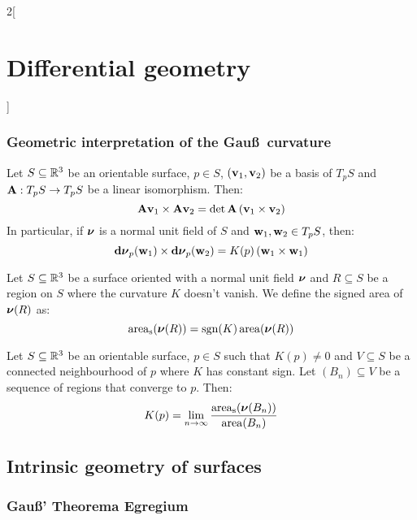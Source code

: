 \documentclass[../../../main.tex]{subfiles}
\begin{document}
\begin{multicols}{2}[\section{Differential geometry}]
  \subsubsection{Geometric interpretation of the Gau\ss\ curvature}
  \begin{lemma}
    Let $S\subseteq\mathbb{R}^3$ be an orientable surface, $p\in S$, $(\boldsymbol{\mathrm{v}}_1,\boldsymbol{\mathrm{v}}_2)$ be a basis of $T_pS$ and $\boldsymbol{\mathrm{A}}:T_pS\rightarrow T_pS$ be a linear isomorphism. Then: $$\boldsymbol{\mathrm{A}}\boldsymbol{\mathrm{v}}_1\times\boldsymbol{\mathrm{A}}\boldsymbol{\mathrm{v}}_2=\det\boldsymbol{\mathrm{A}}\left(\boldsymbol{\mathrm{v}}_1\times\boldsymbol{\mathrm{v}}_2\right)$$
    In particular, if $\boldsymbol{\mathrm{\nu}}$ is a normal unit field of $S$ and $\boldsymbol{\mathrm{w}}_1,\boldsymbol{\mathrm{w}}_2\in T_pS$, then: $$\boldsymbol{\mathrm{\dd{\nu}}}_p(\boldsymbol{\mathrm{w}}_1)\times\boldsymbol{\mathrm{\dd{\nu}}}_p(\boldsymbol{\mathrm{w}}_2)=K(p)\left(\boldsymbol{\mathrm{w}}_1\times\boldsymbol{\mathrm{w}}_1\right)$$
  \end{lemma}
  \begin{definition}
    Let $S\subseteq\mathbb{R}^3$ be a surface oriented with a normal unit field $\boldsymbol{\mathrm{\nu}}$ and $R\subseteq S$ be a region on $S$ where the curvature $K$ doesn't vanish. We define the signed area of $\boldsymbol{\mathrm{\nu}}(R)$ as: $$\operatorname{area}_\text{s}(\boldsymbol{\mathrm{\nu}}(R))=\operatorname{sgn}(K)\operatorname{area}(\boldsymbol{\mathrm{\nu}}(R))$$
  \end{definition}
  \begin{proposition}
    Let $S\subseteq\mathbb{R}^3$ be an orientable surface, $p\in S$ such that $K(p)\ne 0$ and $V\subseteq S$ be a connected neighbourhood of $p$ where $K$ has constant sign. Let $(B_n)\subseteq V$ be a sequence of regions that converge to $p$. Then: $$K(p)=\lim_{n\to\infty}\frac{\operatorname{area}_\text{s}(\boldsymbol{\mathrm{\nu}}(B_n))}{\operatorname{area}(B_n)}$$
  \end{proposition}
  \subsection{Intrinsic geometry of surfaces}
  \subsubsection{Gau\ss' Theorema Egregium}
\end{multicols}
\end{document}
